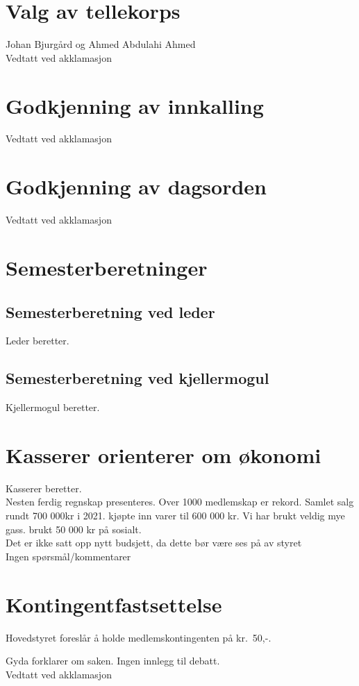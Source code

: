 \documentclass[10pt,norsk,a4paper,usenames,dvipsnames]{article}
\begin{document}
\section{Valg av tellekorps}
Johan Bjurgård og
Ahmed Abdulahi Ahmed\\
Vedtatt ved akklamasjon

\section{Godkjenning av innkalling}
Vedtatt ved akklamasjon

\section{Godkjenning av dagsorden}
Vedtatt ved akklamasjon
\section{Semesterberetninger}
    \subsection{Semesterberetning ved leder}
    Leder beretter.
    \subsection{Semesterberetning ved kjellermogul}
    Kjellermogul beretter.
    
\section{Kasserer orienterer om økonomi}
    Kasserer beretter.\\
    Nesten ferdig regnskap presenteres. Over 1000 medlemskap er rekord. Samlet salg rundt 700 000kr i 2021. kjøpte inn varer til 600 000 kr. Vi har brukt veldig mye gass. brukt 50 000 kr på sosialt.\\
    Det er ikke satt opp nytt budsjett, da dette bør være ses på av styret\\
    Ingen spørsmål/kommentarer

\section{Kontingentfastsettelse}
    Hovedstyret foreslår å holde medlemskontingenten på kr.~50,-.
    
    Gyda forklarer om saken.
    Ingen innlegg til debatt.\\
    Vedtatt ved akklamasjon
\end{document}
